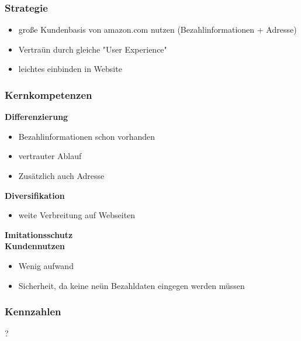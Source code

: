 \subsubsection{ Strategie}
	\begin{itemize}
	\item große Kundenbasis von amazon.com nutzen (Bezahlinformationen + Adresse)
	\item Vertraün durch gleiche "User Experience"
	\item leichtes einbinden in Website
	\end{itemize}

\subsubsection{ Kernkompetenzen}
\textbf{Differenzierung}\\
	\begin{itemize}
	\item Bezahlinformationen schon vorhanden
	\item vertrauter Ablauf
	\item Zusätzlich auch Adresse
	\end{itemize}
\textbf{Diversifikation}\\
	\begin{itemize}
	\item weite Verbreitung auf Webseiten
	\end{itemize}
\textbf{Imitationsschutz}\\
\textbf{Kundennutzen}\\
	\begin{itemize}
	\item Wenig aufwand
	\item Sicherheit, da keine neün Bezahldaten eingegen werden müssen
	\end{itemize}

\subsubsection{ Kennzahlen}
?
